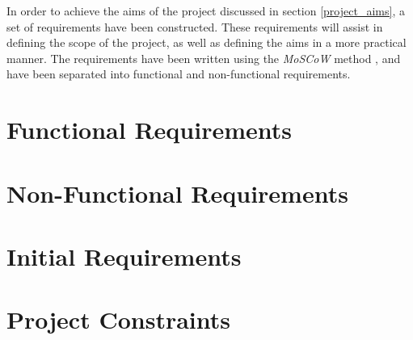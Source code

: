 In order to achieve the aims of the project discussed in section \ref{project_aims}, a set of requirements have been constructed.
These requirements will assist in defining the scope of the project, as well as defining the aims in a more practical manner.
The requirements have been written using the \textit{MoSCoW} method \cite{moscow}, and have been separated into functional and non-functional requirements.

\section{Functional Requirements}
\label{functional_requirements}


\section{Non-Functional Requirements}
\label{non_functional_requirements}


\section{Initial Requirements}
\label{initial_requirements}


\section{Project Constraints}
\label{project_constraints}

